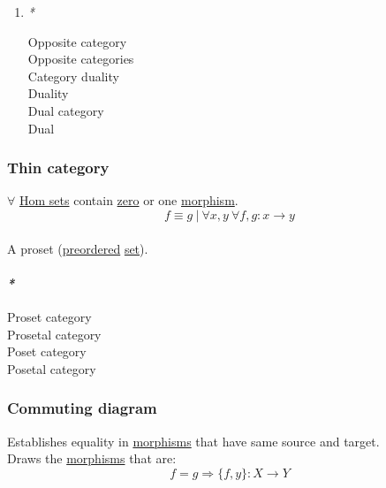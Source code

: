 \documentclass[11pt]{article}
\begin{document}
\begin{enumerate}
\item \emph{*}
\label{sec:org9b47846}

\label{org97c2d69}Opposite category\\
\label{orgcbf15a6}Opposite categories\\
\label{orge0bc871}Category duality\\
\label{org724a3ee}Duality\\
\label{orgcaf96d6}Dual category\\
\label{org0a6da4c}Dual\\
\end{enumerate}

\subsubsection{\label{orgdca9e99}Thin category}
\label{sec:orgef6af14}
\(\forall\) \hyperref[orgf543969]{Hom sets} contain \hyperref[orgf8da8e8]{zero} or one \hyperref[orgad99fc6]{morphism}.\\

$$ f \equiv g \ | \ \forall x,y \ \forall f,g: x \to y $$\\

A proset (\hyperref[org995e436]{preordered} \hyperref[orgbed80ba]{set}).\\

\paragraph{\emph{*}}
\label{sec:org14621fa}

\label{org6d080a7}Proset category\\
\label{org1cddfbe}Prosetal category\\
\label{org56d4907}Poset category\\
\label{org77731b9}Posetal category\\

\subsubsection{\label{org1cee6f8}Commuting diagram}
\label{sec:org15d4d3e}
Establishes equality in \hyperref[org8ed0ce8]{morphisms} that have same source and target.\\

Draws the \hyperref[org8ed0ce8]{morphisms} that are:\\
$$ f = g \Rightarrow \{f, y\}: X \to Y $$\\
\end{document}
